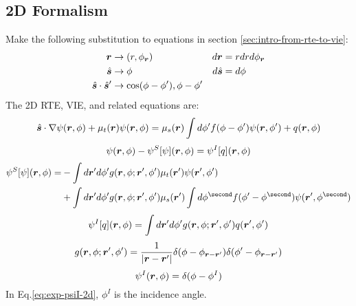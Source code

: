 \documentclass [10pt,letterpaper]{article}
\newcommand{\unitvectorsym}[1]{\hat{\vectorsym{#1}}}
\newcommand{\grad}{\nabla}
\begin{document}
\subsection{2D Formalism}
\label{sub:2d-formalism}
Make the following substitution to equations in section \ref{sec:intro-from-rte-to-vie}:
\begin{align*}
	\vectorsym{r} & \rightarrow(r,\phi_{\vectorsym{r}}) & d\vectorsym{r} &= r dr d\phi_{\vectorsym{r}} \\
	\unitvectorsym{s} & \rightarrow\phi & d\unitvectorsym{s} &= d\phi \\
	\unitvectorsym{s}\cdot\unitvectorsym{s}^\prime & \rightarrow \cos(\phi-\phi^\prime), \phi-\phi^\prime
\end{align*}
The 2D RTE, VIE, and related equations are:
\begin{equation} \label{eq:def-rte-2d}
	\unitvectorsym{s}\cdot\grad\psi(\vectorsym{r},\phi)
	+\mu_t(\vectorsym{r})\psi(\vectorsym{r},\phi)
	=\mu_s(\vectorsym{r})\int d\phi^\prime f(\phi-\phi^\prime)\psi(\vectorsym{r},\phi^\prime)
	+q(\vectorsym{r},\phi)
\end{equation}
\begin{equation} \label{eq:short-vie-2d}
	\psi(\vectorsym{r},\phi)
	-\psi^S[\psi](\vectorsym{r},\phi)
	=\psi^I[q](\vectorsym{r},\phi)
\end{equation}
\begin{equation} \label{eq:def-psiS-2d}
	\begin{split}
		\psi^S[\psi](\vectorsym{r},\phi)=
		&-\int d\vectorsym{r}^\prime d\phi^\prime
		g(\vectorsym{r},\phi;\vectorsym{r}^\prime,\phi^\prime)
		\mu_t(\vectorsym{r}^\prime) \psi(\vectorsym{r}^\prime,\phi^\prime)
		\\ 
		&+\int d\vectorsym{r}^\prime d\phi^\prime
		g(\vectorsym{r},\phi;\vectorsym{r}^\prime,\phi^\prime)
		\mu_s(\vectorsym{r}^\prime)
		\int d\phi^\second
		f(\phi^\prime-\phi^\second) \psi(\vectorsym{r}^\prime,\phi^\second)
	\end{split}
\end{equation}
\begin{equation} \label{eq:def-psiI-2d}
	\psi^I[q](\vectorsym{r},\phi)=
	\int d\vectorsym{r}^\prime d\phi^\prime
	g(\vectorsym{r},\phi;\vectorsym{r}^\prime,\phi^\prime)
	q(\vectorsym{r}^\prime,\phi^\prime)
\end{equation}
\begin{equation} \label{eq:exp-gf-2d}
	g(\vectorsym{r},\phi;\vectorsym{r}^\prime,\phi^\prime)
	=
	\frac{1}{\lvert\vectorsym{r}-\vectorsym{r}^\prime\rvert}
	\delta(\phi-\phi_{\vectorsym{r}-\vectorsym{r}^\prime})
	\delta(\phi^\prime-\phi_{\vectorsym{r}-\vectorsym{r}^\prime})
\end{equation}
\begin{equation} \label{eq:exp-psiI-2d}
	\psi^I(\vectorsym{r},\phi) = \delta(\phi-\phi^I) 
\end{equation}
In Eq.\eqref{eq:exp-psiI-2d}, $\phi^I$ is the incidence angle.
\end{document}
